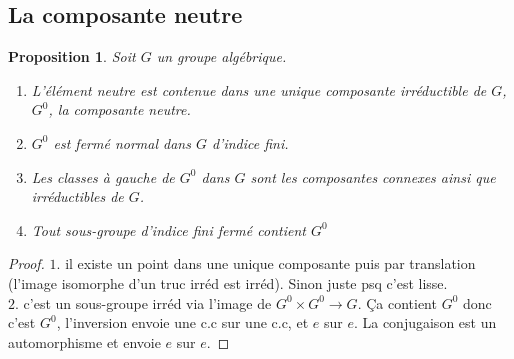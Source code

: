 \documentclass[a4paper,12pt]{book}
\theoremstyle{plain}
\newtheorem{prop}[subsection]{Proposition}
\theoremstyle{definition}
\theoremstyle{remark}
\begin{document}
\subsection{La composante neutre}
\begin{prop}
  Soit $G$ un groupe algébrique.
  \begin{enumerate}
    \item L'élément neutre est contenue dans une unique
      composante irréductible de $G$, $G^0$, la composante neutre.
    \item $G^0$ est fermé normal dans $G$ d'indice fini.
    \item Les classes à gauche de $G^0$ dans $G$ sont les
      composantes connexes ainsi que irréductibles de $G$.
    \item Tout sous-groupe d'indice fini fermé contient $G^0$
  \end{enumerate}
\end{prop}
\begin{proof}
  $1.$ il existe un point dans une unique composante puis par
  translation (l'image isomorphe d'un truc irréd est irréd). Sinon
  juste psq c'est lisse. \\

  $2.$ c'est un sous-groupe irréd via l'image de 
  $G^0\times G^0\to G$. Ça contient $G^0$ donc c'est $G^0$,
  l'inversion envoie une c.c
  sur une c.c, et $e$ sur $e$. La conjugaison est un automorphisme
  et envoie $e$ sur $e$.
\end{proof}
\end{document}
